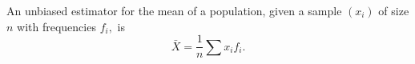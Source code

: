 An unbiased estimator for the mean of a population, given a 
sample $(x_{i})$ of size $n$ with frequencies $f_i,$ 
is 
\[ 
\bar{X} = \frac{1}{n} \sum x_i f_i . 
\]